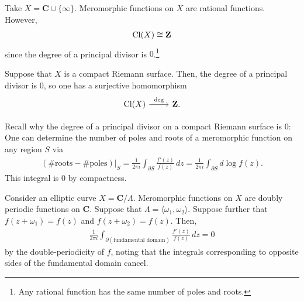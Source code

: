 \documentclass [11 pt, oneside] {article}
\begin{document}
\begin{example}[ ]\label{}\text{}
Take $X=\mathbf{C}\cup\{\infty\}$. Meromorphic functions on $X$ are rational functions. However, 
\begin{align*}
	\operatorname{Cl}(X)\cong  \mathbf{Z}
\end{align*}
since the degree of a principal divisor is $0$.\footnote{Any rational function has the same number of poles and roots.}

Suppose that $X$ is a compact Riemann surface. Then, the degree of a principal divisor is $0$, so one has a surjective homomorphism
\[
\begin{tikzcd}
	\Cl(X)\ar[r,"\deg"]& \mathbf{Z}.
\end{tikzcd}
\]
\end{example}

Recall why the degree of a principal divisor on a compact Riemann surface is $0$: One can determine the number of poles and roots of a meromorphic function on any region $S$ via
\begin{align*}
	(\#\textrm{roots} - \#\textrm{poles})\big|_{S}=\frac{1}{2\pi i}\int_{\partial S}^{} \frac{f'(z)}{f(z)}  \, dz = \frac{1}{2\pi i}\int_{\partial S}^{} d\log f(z).  
\end{align*}
This integral is $0$ by compactness.

\begin{example}[ ]\label{}\text{}
Consider an elliptic curve $X=\mathbf{C}/\Lambda$. Meromorphic functions on $X$ are doubly periodic functions on $\mathbf{C}$. Suppose that $\Lambda = \langle \omega_1,\omega_2\rangle$. Suppose further that $f(z+\omega_1)=f(z)$ and $f(z+\omega_2)=f(z)$. Then,
\begin{align*}
	\frac{1}{2\pi i} \int_{\partial(\textrm{fundamental domain})}^{}  \frac{f'(z)}{f(z)} \, dz =0
\end{align*}
by the double-periodicity of $f$, noting that the integrals corresponding to opposite sides of the fundamental domain cancel.
\end{example}
\end{document}
